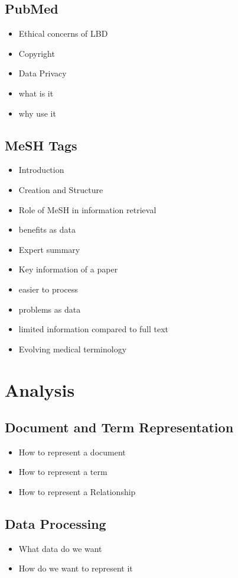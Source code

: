 \documentclass{l4proj}
\begin{document}
\section{PubMed}
\begin{itemize}
    \item Ethical concerns of LBD
    \item Copyright
    \item Data Privacy
    \item what is it
    \item why use it
\end{itemize}

\section{MeSH Tags}
\begin{itemize}
    \item Introduction
    \item Creation and Structure
    \item Role of MeSH in information retrieval 
    \item benefits as data 
    \item Expert summary
    \item Key information of a paper
    \item easier to process
    \item problems as data
    \item limited information compared to full text
    \item Evolving medical terminology
\end{itemize}

\chapter{Analysis}
\section{Document and Term Representation}
\begin{itemize}
    \item How to represent a document
    \item How to represent a term
    \item How to represent a Relationship
\end{itemize}
\section{Data Processing}
\begin{itemize}
    \item What data do we want
    \item How do we want to represent it
\end{itemize}
\end{document}
